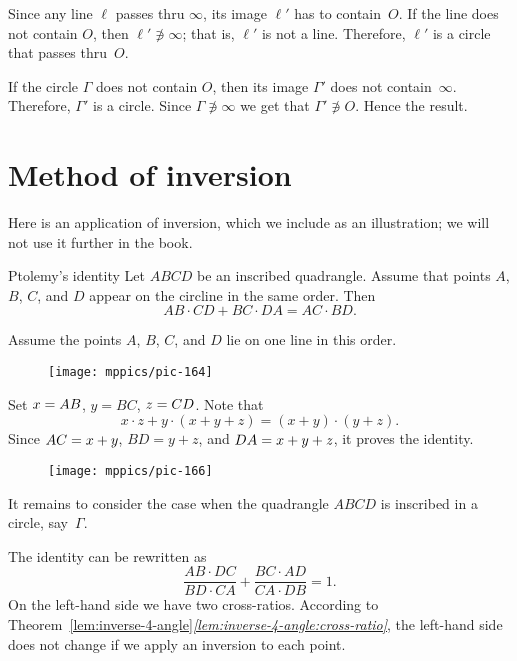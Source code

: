 Since any line $\ell$ passes thru $\infty$, its image $\ell'$ has to contain~$O$.
If the line does not contain $O$, 
then $\ell'\not\ni \infty$;
that is, $\ell'$ is not a line.
Therefore, $\ell'$ is a circle that passes thru~$O$. 

If the circle $\Gamma$ does not contain $O$, 
then its image $\Gamma'$ does not contain~$\infty$.
Therefore, $\Gamma'$ is a circle.
Since  $\Gamma\not\ni\infty$ we get that $\Gamma' \not\ni O$.
Hence the result.
\qeds

\section{Method of inversion}

Here is an application of inversion,
which we include as an illustration;
we will not use it further in the book.

\begin{thm}{Ptolemy's identity}\label{ptolemy-id}
Let $ABCD$ be an inscribed quadrangle.
Assume that points $A$, $B$, $C$, and $D$ appear on the circline in the same order.
Then 
$$ AB\cdot CD+ BC\cdot DA=AC\cdot BD.$$

\end{thm}

Assume the points $A$, $B$, $C$, and $D$ lie on one line in this order.

\begin{wrapfigure}{o}{39mm}
\centering
\texttt{[image: mppics/pic-164]}
\end{wrapfigure}

Set $x=AB$, $y=BC$, $z=CD$.
Note that
$$x\cdot z+y\cdot (x+y+z)=(x+y)\cdot(y+z).$$
Since $AC=x+y$, $BD=y+z$, and $DA=x+y+z$,
it proves the identity.

\begin{wrapfigure}{o}{39mm}
\centering
\texttt{[image: mppics/pic-166]}
\end{wrapfigure}

It remains to consider the case when the quadrangle $ABCD$ is inscribed in a circle, say~$\Gamma$. 

The identity can be rewritten as 
$$\frac{AB\cdot DC}{ BD\cdot CA}+ \frac{BC\cdot AD}{CA\cdot DB}=1.$$
On the left-hand side we have two cross-ratios.
According to Theorem~\ref{lem:inverse-4-angle}\textit{\ref{lem:inverse-4-angle:cross-ratio}}, the left-hand side does not change if we apply an inversion to each point.


